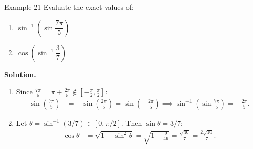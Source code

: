 \begin{examplebox}{Example 21}
Evaluate the exact values of: \\
\begin{enumerate}
    \item \(\sin^{-1}\!\left(\sin\dfrac{7\pi}{5}\right)\)
    \item \(\cos\!\left(\sin^{-1}\dfrac{3}{7}\right)\)
\end{enumerate}

\medskip
\textbf{Solution.}
\begin{enumerate}
    \item Since \(\frac{7\pi}{5} = \pi + \frac{2\pi}{5} \notin [-\frac{\pi}{2}, \frac{\pi}{2}]\):
    \begin{align*}
    \sin\left(\frac{7\pi}{5}\right) &= -\sin\left(\frac{2\pi}{5}\right) = \sin\left(-\frac{2\pi}{5}\right) \implies \sin^{-1}\!\left(\sin\frac{7\pi}{5}\right) = -\frac{2\pi}{5}.
    \end{align*}
    \item Let \(\theta = \sin^{-1}(3/7) \in [0, \pi/2]\). Then \(\sin\theta = 3/7\):
    \begin{align*}
    \cos\theta &= \sqrt{1 - \sin^2\theta} = \sqrt{1 - \frac{9}{49}} = \frac{\sqrt{40}}{7} = \frac{2\sqrt{10}}{7}.
    \end{align*}
\end{enumerate}
\end{examplebox}

